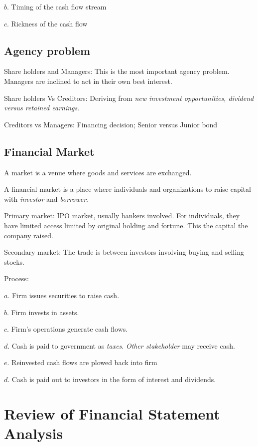 \documentclass[10pt, a4paper]{article}
\begin{document}
            $b$. Timing of the cash flow stream

            $c$. Rickness of the cash flow

        \subsection{Agency problem}
            Share holders and Managers: This is the most important agency problem. Managers are inclined to act in their own best interest. 
            
            Share holders Vs Creditors: Deriving from \emph{new investment opportunities, dividend versus retained earnings}.

            Creditors vs Managers: Financing decision; Senior versus Junior bond
        \subsection{Financial Market}
            A market is a venue where goods and services are exchanged. 

            A financial market is a place where individuals and organizations to raise capital with \emph{investor} and \emph{borrower}.

            Primary market: IPO market, usually bankers involved. For individuals, they have limited access limited by original holding and fortune. This the capital the company raised. 

            Secondary market: The trade is between investors involving buying and selling stocks. 

            \noindent Process:

                $a$. Firm issues securities to raise cash.
                
                $b$. Firm invests in assets.
                
                $c$. Firm's operations generate cash flows.

                $d$. Cash is paid to government as \emph{taxes}. \emph{Other stakeholder} may receive cash. 

                $e$. Reinvested cash flows are plowed back into firm
                
                $d$. Cash is paid out to investors in the form of interest and dividends.
    
    \section{Review of Financial Statement Analysis}
\end{document}
